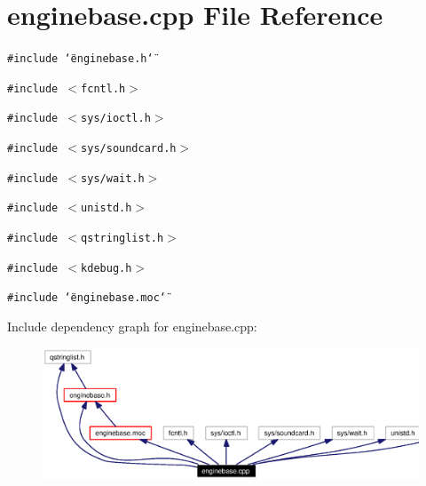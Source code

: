 \section{enginebase.cpp File Reference}
\label{enginebase_8cpp}


{\tt \#include \char`\"{}enginebase.h\char`\"{}}\par
{\tt \#include $<$fcntl.h$>$}\par
{\tt \#include $<$sys/ioctl.h$>$}\par
{\tt \#include $<$sys/soundcard.h$>$}\par
{\tt \#include $<$sys/wait.h$>$}\par
{\tt \#include $<$unistd.h$>$}\par
{\tt \#include $<$qstringlist.h$>$}\par
{\tt \#include $<$kdebug.h$>$}\par
{\tt \#include \char`\"{}enginebase.moc\char`\"{}}\par


Include dependency graph for enginebase.cpp:\begin{figure}[H]
\begin{center}
\leavevmode
\includegraphics[width=337pt]{enginebase_8cpp__incl}
\end{center}
\end{figure}
